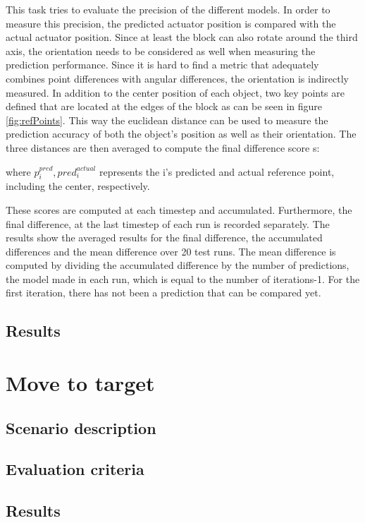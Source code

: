 This task tries to evaluate the precision of the different models. In order to measure this precision, the predicted actuator position
is compared with the actual actuator position. Since at least the block can also rotate around the third axis, the orientation needs to be
considered as well when measuring the prediction performance. Since it is hard to find a metric that adequately combines point differences with
angular differences, the orientation is indirectly measured. In addition to the center position of each object, two key points are defined that
are located at the edges of the block as can be seen in figure \ref{fig:refPoints}. This way the euclidean distance can be used to measure the
prediction accuracy of both the object's position as well as their orientation. The three distances are then averaged to compute the final difference
score s:


where $p^{pred}_i, pred^{actual}_i$ represents the i's predicted and actual reference point, including the center, respectively.

These scores are computed at each timestep and accumulated. Furthermore, the final difference, at the last timestep of each run is recorded separately.
The results show the averaged results for the final difference, the accumulated differences and the mean difference over 20 test runs. The mean difference
is computed by dividing the accumulated difference by the number of predictions, the model made in each run, which is equal to the number of iterations-1. For the
first iteration, there has not been a prediction that can be compared yet.

\subsection{Results}




\section{Move to target \label{sec:moveToTarget}}

\subsection{Scenario description}

\subsection{Evaluation criteria}

\subsection{Results}